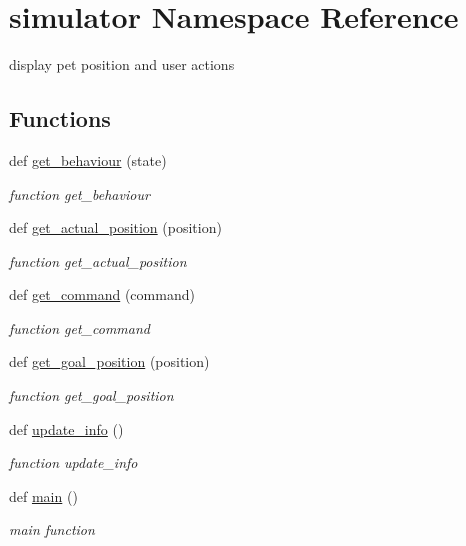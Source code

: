 \hypertarget{namespacesimulator}{}\section{simulator Namespace Reference}
\label{namespacesimulator}


display pet position and user actions  


\subsection*{Functions}
\begin{DoxyCompactItemize}
\item 
def \hyperlink{namespacesimulator_affbc3bee7f4b28215c4fe9e5e9e01003}{get\+\_\+behaviour} (state)
\begin{DoxyCompactList}\small\item\em function get\+\_\+behaviour \end{DoxyCompactList}\item 
def \hyperlink{namespacesimulator_a5265ad4eaba9f8ccb6ff896b006d0f70}{get\+\_\+actual\+\_\+position} (position)
\begin{DoxyCompactList}\small\item\em function get\+\_\+actual\+\_\+position \end{DoxyCompactList}\item 
def \hyperlink{namespacesimulator_a06561cb374c45cd36cb7f77886cc7a7f}{get\+\_\+command} (command)
\begin{DoxyCompactList}\small\item\em function get\+\_\+command \end{DoxyCompactList}\item 
def \hyperlink{namespacesimulator_ad83902aab63958c0d241d17880635167}{get\+\_\+goal\+\_\+position} (position)
\begin{DoxyCompactList}\small\item\em function get\+\_\+goal\+\_\+position \end{DoxyCompactList}\item 
def \hyperlink{namespacesimulator_a66bbb06efc0fb9abaefbfde72c8f0b85}{update\+\_\+info} ()
\begin{DoxyCompactList}\small\item\em function update\+\_\+info \end{DoxyCompactList}\item 
def \hyperlink{namespacesimulator_a711d5bb80a277154e14a12260c2d3b21}{main} ()
\begin{DoxyCompactList}\small\item\em main function \end{DoxyCompactList}\end{DoxyCompactItemize}
